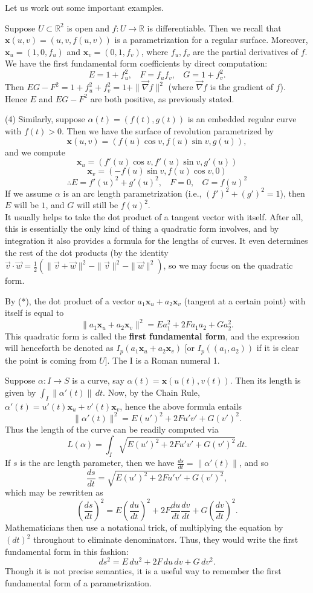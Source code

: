 \documentclass[leqno]{book}
\begin{document}
\noindent Let us work out some important examples.

Suppose $U\subset\mathbb R^2$ is open and $f:U\to\mathbb R$ is differentiable.  Then we recall that $\mathbf x(u,v)=(u,v,f(u,v))$ is a parametrization for a regular surface.  Moreover, $\mathbf x_u=(1,0,f_u)$ and $\mathbf x_v=(0,1,f_v)$, where $f_u,f_v$ are the partial derivatives of $f$.  We have the first fundamental form coefficients by direct computation:
$$E=1+f_u^2,~~~~F=f_uf_v,~~~~G=1+f_v^2.$$
Then $EG-F^2=1+f_u^2+f_v^2=1+\|\vec\nabla f\|^2$ (where $\vec\nabla f$ is the gradient of $f$).  Hence $E$ and $EG-F^2$ are both positive, as previously stated.

(4) Similarly, suppose $\alpha(t)=(f(t),g(t))$ is an embedded regular curve with $f(t)>0$.  Then we have the surface of revolution parametrized by
$$\mathbf x(u,v)=(f(u)\cos v,f(u)\sin v,g(u)),$$
and we compute
$$\mathbf x_u=(f'(u)\cos v,f'(u)\sin v,g'(u))$$
$$\mathbf x_v=(-f(u)\sin v,f(u)\cos v,0)$$
$$\therefore E=f'(u)^2+g'(u)^2,~~~~F=0,~~~~G=f(u)^2$$
If we assume $\alpha$ is an arc length parametrization (i.e., $(f')^2+(g')^2=1$), then $E$ will be $1$, and $G$ will still be $f(u)^2$.\\

\noindent It usually helps to take the dot product of a tangent vector with itself.  After all, this is essentially the only kind of thing a quadratic form involves, and by integration it also provides a formula for the lengths of curves.  It even determines the rest of the dot products (by the identity $\vec v\cdot\vec w=\frac 12(\|\vec v+\vec w\|^2-\|\vec v\|^2-\|\vec w\|^2)$, so we may focus on the quadratic form.

By (*), the dot product of a vector $a_1\mathbf x_u+a_2\mathbf x_v$ (tangent at a certain point) with itself is equal to
$$\|a_1\mathbf x_u+a_2\mathbf x_v\|^2=Ea_1^2+2Fa_1a_2+Ga_2^2.$$
This quadratic form is called the \textbf{first fundamental form}, and the expression will henceforth be denoted as $I_p(a_1\mathbf x_u+a_2\mathbf x_v)$ [or $I_p((a_1,a_2))$ if it is clear the point is coming from $U$].  The I is a Roman numeral 1.

Suppose $\alpha:I\to S$ is a curve, say $\alpha(t)=\mathbf x(u(t),v(t))$.  Then its length is given by $\int_I\|\alpha'(t)\|\,dt$.  Now, by the Chain Rule, $\alpha'(t)=u'(t)\mathbf x_u+v'(t)\mathbf x_v$, hence the above formula entails
$$\|\alpha'(t)\|^2=E(u')^2+2Fu'v'+G(v')^2.$$
Thus the length of the curve can be readily computed via
$$L(\alpha)=\int_I\sqrt{E(u')^2+2Fu'v'+G(v')^2}\,dt.$$
If $s$ is the arc length parameter, then we have $\frac{ds}{dt}=\|\alpha'(t)\|$, and so
$$\frac{ds}{dt}=\sqrt{E(u')^2+2Fu'v'+G(v')^2},$$
which may be rewritten as
$$\left(\frac{ds}{dt}\right)^2=E\left(\frac{du}{dt}\right)^2+2F\frac{du}{dt}\frac{dv}{dt}+G\left(\frac{dv}{dt}\right)^2.$$
Mathematicians then use a notational trick, of multiplying the equation by $(dt)^2$ throughout to eliminate denominators.  Thus, they would write the first fundamental form in this fashion:
$$ds^2=E\,du^2+2F\,du\,dv+G\,dv^2.$$
Though it is not precise semantics, it is a useful way to remember the first fundamental form of a parametrization.
\end{document}
